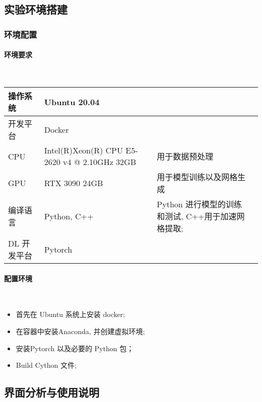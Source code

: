 \subsection{实验环境搭建}

\subsubsection{环境配置}
\vspace{0.5em} %
\paragraph{环境要求}~{}

\begin{table}[h]
\renewcommand\arraystretch{1.5}
    \centering
    \begin{tabularx}{\textwidth}{X X X X}
        \hline
		操作系统 	& Ubuntu 20.04 	& \\
		\hline
		开发平台 	& Docker			& \\
		\hline
		CPU 		& Intel(R)Xeon(R) CPU E5-2620 v4 @ 2.10GHz 32GB & 用于数据预处理 \\
		\hline
		GPU 		& RTX 3090 24GB		& 用于模型训练以及网格生成 \\
		\hline
		编译语言 	& Python, C++ 		& Python 进行模型的训练和测试, C++用于加速网格提取; \\
		\hline
		DL 开发平台 & Pytorch 		& \\
		\hline
    \end{tabularx}
\end{table}

\paragraph{配置环境}~{}

\begin{itemize}
	\item 首先在 Ubuntu 系统上安装 docker;
	\item 在容器中安装Anaconda, 并创建虚拟环境;
	\item 安装Pytorch 以及必要的 Python 包；
	\item Build Cython 文件;
\end{itemize}

\subsection{界面分析与使用说明}

